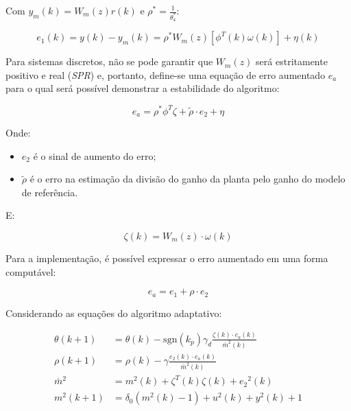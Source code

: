     Com $y_m(k) = W_m(z) r(k)$ e $\rho^* = \frac{1}{\theta_4^*}$:

    \begin{equation*}
        e_1(k) = y(k) - y_m(k) = \rho^* W_m(z) \left[ \phi^T(k) \omega(k) \right] + \eta(k)
    \end{equation*}

    Para sistemas discretos, não se pode garantir que $W_m(z)$ será estritamente positivo e real
    (\emph{SPR}) e, portanto, define-se uma equação de erro aumentado $e_a$ para o qual será possível
    demonstrar a estabilidade do algoritmo:

    \begin{equation*}
        e_a = \rho^* \phi^T \zeta + \tilde{\rho} \cdot e_2 + \eta
    \end{equation*}

    Onde:

    \begin{itemize}[leftmargin=+2cm]
        \item[] $e_2$ é o sinal de aumento do erro;
        \item[] $\tilde{\rho}$ é o erro na estimação da divisão do ganho da planta
            pelo ganho do modelo de referência.
    \end{itemize}

    E:

    \begin{equation}
        \zeta(k) = W_m(z) \cdot \omega(k)
        \label{eq:zeta}
    \end{equation}

    Para a implementação, é possível expressar o erro aumentado em uma forma computável:

    \begin{equation}
        e_a = e_1 + \rho \cdot e_2
        \label{eq:erro_aumentado_computavel}
    \end{equation}

    Considerando as equações do algoritmo adaptativo:

    \begin{equation}
        \begin{split}
            \theta(k+1) &= \theta(k) - \mathrm{sgn}(k_p) \gamma_d \frac{\zeta(k) \cdot e_a(k)}{{\bar{m}}^2(k)} \\
            \rho(k+1) &= \rho(k) - \gamma \frac{e_2(k) \cdot e_a(k)}{{\bar{m}}^2(k)} \\
            {\bar{m}}^2 &= m^2(k) + \zeta^T(k) \zeta(k) + {e_2}^2(k) \\
            m^2(k+1) &=  \delta_0(m^2(k) - 1) + u^2(k) + y^2(k) + 1
        \end{split}
        \label{eq:equacoes_algoritmo_adaptativo}
    \end{equation}

